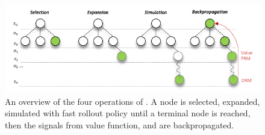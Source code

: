\begin{figure}[!t]
    \centering
    \includegraphics[width=\textwidth]{figures/emcts.pdf}
    \caption{An overview of the four operations of \emcts{}. A node is selected, expanded, simulated with fast rollout policy until a terminal node is reached, then the signals from value function, \prm{} and \orm{} are backpropagated.}
    \label{fig:emcts}
\end{figure}
